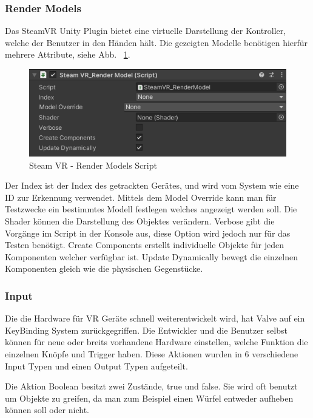 \begin{itemize}
\subsubsection{Render Models}
Das SteamVR Unity Plugin bietet eine virtuelle Darstellung der Kontroller, welche der Benutzer in den Händen hält.
Die gezeigten Modelle benötigen hierfür mehrere Attribute, siehe Abb. ~\ref{fig:steamvr_render_models Script}.
\begin {figure}
    \centering
    \includegraphics[scale=1]{pics/steamVR_render_models_script}
    \caption{Steam VR - Render Models Script}
    \label{fig:steamvr_render_models Script}
\end {figure}
Der Index ist der Index des getrackten Gerätes, und wird vom System wie eine ID zur Erkennung verwendet.
Mittels dem Model Override kann man für Testzwecke ein bestimmtes Modell festlegen welches angezeigt werden soll.
Die Shader können die Darstellung des Objektes verändern.
Verbose gibt die Vorgänge im Script in der Konsole aus, diese Option wird jedoch nur für das Testen benötigt.
Create Components erstellt individuelle Objekte für jeden Komponenten welcher verfügbar ist.
Update Dynamically bewegt die einzelnen Komponenten gleich wie die physischen Gegenstücke.
~\cite{SteamVR_Render_Models_2022}

\subsubsection{Input}
Die die Hardware für VR Geräte schnell weiterentwickelt wird, hat Valve auf ein KeyBinding System zurückgegriffen.
Die Entwickler und die Benutzer selbst können für neue oder breits vorhandene Hardware einstellen, welche Funktion die einzelnen Knöpfe und Trigger haben.
Diese Aktionen wurden in 6 verschiedene Input Typen und einen Output Typen  aufgeteilt.

Die Aktion Boolean besitzt zwei Zustände, true und false.
Sie wird oft benutzt um Objekte zu greifen, da man zum Beispiel einen Würfel entweder aufheben können soll oder nicht.


\end{itemize}

